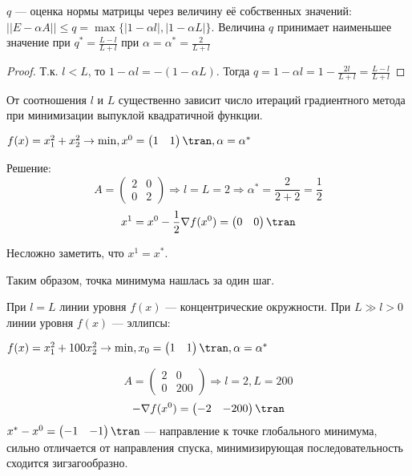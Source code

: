 \(q\) --- оценка нормы матрицы через величину её собственных значений: \(||E - \alpha A|| \leq q = \max \{|1 - \alpha l|, |1 - \alpha L|\} \).  Величина \(q\) принимает наименьшее значение при \(q^* = \frac{L - l}{L + l}\) при \(\alpha = \alpha^* = \frac{2}{L + l}\)
\begin{proof}
    Т.к. \(l < L\), то \(1 - \alpha l = -(1 - \alpha L)\). Тогда \(q = 1 - \alpha l = 1 - \frac{2l}{L + l} = \frac{L - l}{L + l}\)
\end{proof}

От соотношения \(l\) и \(L\) существенно зависит число итераций градиентного метода при минимизации выпуклой квадратичной функции.

\begin{example}[\(L = l > 0\)]
    \(f(x) = x_1^2 + x_2^2 \to \min, x^0 = \begin{pmatrix} 1 & 1 \end{pmatrix}\tran , \alpha = \alpha^*\)

    Решение:
    \[A = \begin{pmatrix} 2 & 0 \\ 0 & 2 \end{pmatrix} \Rightarrow l = L = 2 \Rightarrow \alpha^* = \frac{2}{2 + 2} = \frac{1}{2}\]
    \[x^1 = x^0 - \frac{1}{2} \nabla f(x^0) = \begin{pmatrix} 0 & 0 \end{pmatrix}\tran \]

    Несложно заметить, что \(x^1 = x^*\).

    Таким образом, точка минимума нашлась за один шаг.
\end{example}

При \(l = L\) линии уровня \(f(x)\) --- концентрические окружности. При \(L \gg l > 0\) линии уровня \(f(x)\) --- эллипсы:

\begin{example}[\(L \gg l > 0\)]
    \(f(x) = x_1^2 + 100x_2^2 \to \min , x_0 = \begin{pmatrix} 1 & 1 \end{pmatrix}\tran , \alpha = \alpha^*\)

    \[A = \begin{pmatrix} 2 & 0 \\ 0 & 200 \end{pmatrix} \Rightarrow l = 2, L = 200\]
    \[ - \nabla f(x^0) = \begin{pmatrix} - 2 & - 200 \end{pmatrix}\tran \]
    \(x^* - x^0 = \begin{pmatrix} - 1 & - 1 \end{pmatrix}\tran \) --- направление к точке глобального минимума, сильно отличается от направления спуска, минимизирующая последовательность сходится зигзагообразно.
\end{example}

